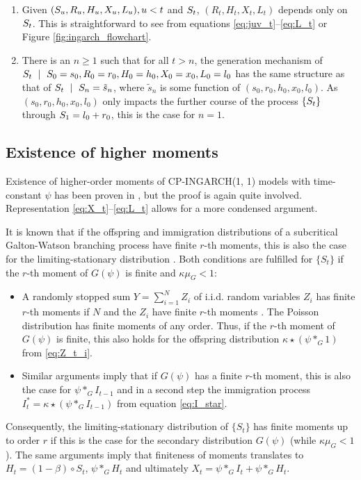 \documentclass[review]{elsarticle}
\begin{document}
\begin{enumerate}
\item Given $(S_u, R_u, H_u, X_u, L_u), u < t$ and $S_t$, $(R_t, H_t, X_t, L_t)$ depends only on $S_t$. This is straightforward to see from equations \eqref{eq:juv_t}--\eqref{eq:L_t} or Figure \ref{fig:ingarch_flowchart}.
\item There is an $n \geq 1$ such that for all $t > n$, the generation mechanism of $\juv_t \ \mid \ \juv_0 = s_0, R_0 = r_0, H_0 = h_0, X_0 = x_0, L_0 = l_0$ has the same structure as that of $\juv_t \ \mid \ \juv_n = \tilde{s}_n$, where $\tilde{s}_n$ is some function of $(s_0, r_0, h_0, x_0, l_0)$. As $(s_0, r_0, h_0, x_0, l_0)$ only impacts the further course of the process $\{S_t\}$ through $S_1 = l_0 + r_0$, this is the case for $n = 1$. %
\end{enumerate}

\subsection{Existence of higher moments}

Existence of higher-order moments of CP-INGARCH(1, 1) models with time-constant $\psi$ has been proven in \cite{Silva2016}, but the proof is again quite involved. Representation \eqref{eq:X_t}--\eqref{eq:L_t} allows for a more condensed argument.

It is known that if the offspring and immigration distributions of a subcritical Galton-Watson branching process have finite $r$-th moments, this is also the case for the limiting-stationary distribution \cite[Sec. 4]{Lange1981}. Both conditions are fulfilled for $\{S_t\}$ if the $r$-th moment of $G(\psi)$ is finite and $\kappa\mu_G < 1$:

\begin{itemize}
\item A randomly stopped sum $Y = \sum_{i = 1}^N Z_i$ of i.i.d. random variables $Z_i$ has finite $r$-th moments if $N$ and the $Z_i$ have finite $r$-th moments \cite[Theorem 5.2]{Gut2009}. The Poisson distribution has finite moments of any order. Thus, if the $r$-th moment of $G(\psi)$ is finite, this also holds for the offspring distribution $\kappa \star (\psi *_G 1)$ from \eqref{eq:Z_t_i}.
\item Similar arguments imply that if $G(\psi)$ has a finite $r$-th moment, this is also the case for $\psi *_G I_{t - 1}$ and in a second step the immigration process $I^*_t = \kappa \star(\psi *_G I_{t - 1})$ from equation \eqref{eq:I_star}.
\end{itemize}
Consequently, the limiting-stationary distribution of $\{S_t\}$ has finite moments up to order $r$ if this is the case for the secondary distribution $G(\psi)$ (while $\kappa\mu_G < 1$). The same arguments imply that finiteness of moments translates to $H_t = (1 - \beta) \circ S_t$, $\psi *_G H_t$ and ultimately $X_t = \psi *_G I_t + \psi *_G H_t$.
\end{document}
